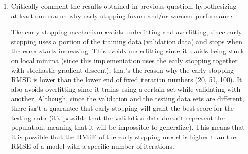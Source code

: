 \documentclass[12pt]{article}
\begin{document}
\begin{enumerate}
    \item Critically comment the results obtained in previous question, hypothesizing at least
    one reason why early stopping favors and/or worsens performance.

    The early stopping mechanism avoids underfitting and overfitting, since early stopping uses a portion of the training data (validation data) and stops when the error starts increasing. This avoids underfitting since it avoids being stuck on local minima (since this implementation uses the early stopping together with stochastic gradient descent), that's the reason why the early stopping RMSE is lower than the lower end of fixed iteration numbers (20, 50, 100). It also avoids overfitting since it trains using a certain set while validating with another. Although, since the validation and the testing data sets are different, there isn't a guarantee that early stopping will grant the best score for the testing data (it's possible that the validation data doesn't represent the population, meaning that it will be impossible to generalize). This means that it is possible that the RMSE of the early stopping model is higher than the RMSE of a model with a specific number of iterations.

\end{enumerate}
\end{document}
